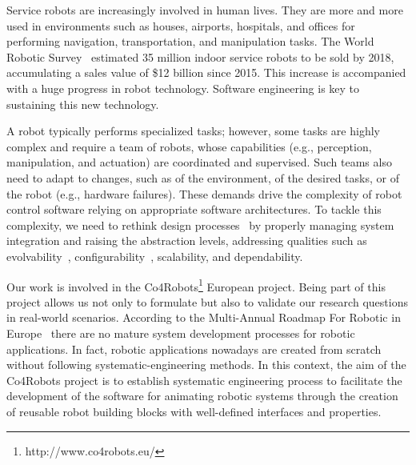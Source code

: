 Service robots are increasingly involved in human lives. 
They are more and more used in environments such as houses, airports, hospitals, and offices for performing navigation, transportation, and manipulation tasks. 
The World Robotic Survey~\cite{wrs:online} estimated 35 million indoor service robots to be sold by 2018, accumulating a sales value of \$12 billion since 2015. 
This increase is accompanied with a huge progress in robot technology. %
Software engineering is key to sustaining this new technology.

A robot typically performs specialized tasks; however, some tasks are highly complex and require a team of robots, whose capabilities (e.g., perception, manipulation, and actuation) are coordinated and supervised. 
Such teams also need to adapt to changes, such as of the environment, of the desired tasks, or of the robot (e.g., hardware failures). 
These demands drive the complexity of robot control software relying on appropriate software architectures. 
To tackle this complexity, we need to rethink design processes~\cite{Lee2008} by properly managing system integration and raising the abstraction levels, addressing qualities such as evolvability~\cite{Perez2008}, configurability~\cite{Gamez2013563}, scalability, and dependability.

Our work is involved in the Co4Robots\footnote{http://www.co4robots.eu/} European project.
Being part of this project allows us not only to formulate but also to validate our research questions in real-world scenarios.
According to the Multi-Annual Roadmap For Robotic in Europe~\cite{roadmap} there are no mature system development processes for robotic applications.
In fact, robotic applications nowadays are created from scratch without following systematic-engineering methods.
In this context, the aim of the Co4Robots project is to establish systematic engineering process to facilitate the development of the software for animating robotic systems through the creation of reusable robot building blocks with well-defined interfaces and properties. 

